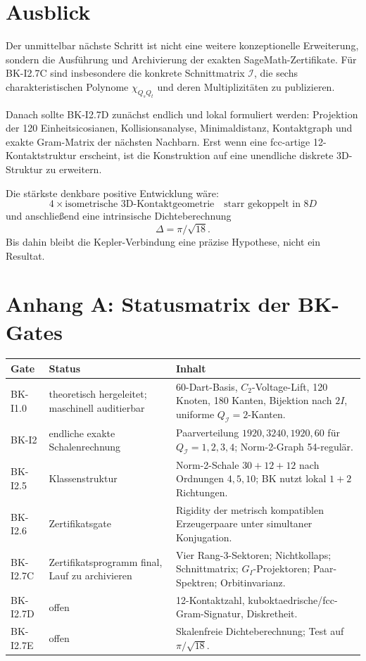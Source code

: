 \documentclass[11pt,a4paper]{article}
\theoremstyle{definition}
\theoremstyle{remark}
\newcommand{\QI}{Q_{\mathcal I}}
\begin{document}
\section{Ausblick}
Der unmittelbar nächste Schritt ist nicht eine weitere konzeptionelle Erweiterung, sondern die Ausführung und Archivierung der exakten SageMath-Zertifikate. Für BK-I2.7C sind insbesondere die konkrete Schnittmatrix $\mathcal I$, die sechs charakteristischen Polynome $\chi_{Q_sQ_t}$ und deren Multiplizitäten zu publizieren.

Danach sollte BK-I2.7D zunächst endlich und lokal formuliert werden: Projektion der 120 Einheitsicosianen, Kollisionsanalyse, Minimaldistanz, Kontaktgraph und exakte Gram-Matrix der nächsten Nachbarn. Erst wenn eine fcc-artige 12-Kontaktstruktur erscheint, ist die Konstruktion auf eine unendliche diskrete 3D-Struktur zu erweitern.

Die stärkste denkbare positive Entwicklung wäre:
\[
\boxed{
4\times\text{isometrische 3D-Kontaktgeometrie}
\quad\text{starr gekoppelt in }8D
}
\]
und anschließend eine intrinsische Dichteberechnung
\[
\boxed{\Delta=\pi/\sqrt{18}}.
\]
Bis dahin bleibt die Kepler-Verbindung eine präzise Hypothese, nicht ein Resultat.

\appendix
\section{Anhang A: Statusmatrix der BK-Gates}
\begin{longtable}{p{2.5cm}p{4.4cm}p{7.0cm}}
\toprule
\textbf{Gate} & \textbf{Status} & \textbf{Inhalt}\\
\midrule
BK-I1.0 & theoretisch hergeleitet; maschinell auditierbar &
60-Dart-Basis, $C_2$-Voltage-Lift, 120 Knoten, 180 Kanten, Bijektion nach $2I$, uniforme $\QI=2$-Kanten.\\
BK-I2 & endliche exakte Schalenrechnung &
Paarverteilung $1920,3240,1920,60$ für $\QI=1,2,3,4$; Norm-2-Graph 54-regulär.\\
BK-I2.5 & Klassenstruktur &
Norm-2-Schale $30+12+12$ nach Ordnungen $4,5,10$; BK nutzt lokal $1+2$ Richtungen.\\
BK-I2.6 & Zertifikatsgate &
Rigidity der metrisch kompatiblen Erzeugerpaare unter simultaner Konjugation.\\
BK-I2.7C & Zertifikatsprogramm final, Lauf zu archivieren &
Vier Rang-3-Sektoren; Nichtkollaps; Schnittmatrix; $G_I$-Projektoren; Paar-Spektren; Orbitinvarianz.\\
BK-I2.7D & offen &
12-Kontaktzahl, kuboktaedrische/fcc-Gram-Signatur, Diskretheit.\\
BK-I2.7E & offen &
Skalenfreie Dichteberechnung; Test auf $\pi/\sqrt{18}$.\\
\bottomrule
\end{longtable}
\end{document}
